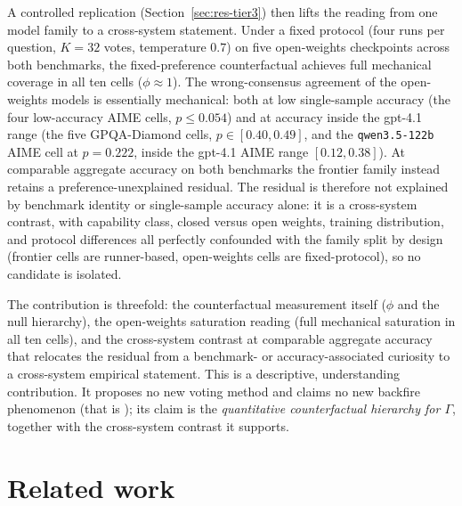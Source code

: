 \documentclass{article}
\newcommand{\agreementIndex}{\Gamma}
\begin{document}
A controlled replication (Section~\ref{sec:res-tier3}) then lifts the
reading from one model family to a cross-system statement. Under a fixed
protocol (four runs per question, $K=32$ votes, temperature $0.7$) on
five open-weights checkpoints across both benchmarks, the
fixed-preference counterfactual achieves full mechanical
coverage in all ten cells ($\phi\approx1$). The
wrong-consensus agreement of the open-weights models is essentially
mechanical: both at low single-sample accuracy (the four low-accuracy AIME cells,
$p\le0.054$) and at accuracy inside the gpt-4.1 range (the five GPQA-Diamond
cells, $p\in[0.40,0.49]$, and the \texttt{qwen3.5-122b} AIME cell at
$p=0.222$, inside the gpt-4.1 AIME range $[0.12,0.38]$). At comparable
aggregate accuracy on both benchmarks the frontier family instead retains a
preference-unexplained residual. The residual is therefore not
explained by benchmark identity or single-sample accuracy alone: it is a cross-system
contrast, with capability class, closed versus open weights, training
distribution, and protocol differences all perfectly confounded with the
family split by design (frontier cells are runner-based, open-weights
cells are fixed-protocol), so no candidate is isolated.

The contribution is threefold: the counterfactual measurement itself
($\phi$ and the null hierarchy), the open-weights saturation reading
(full mechanical saturation in all ten cells), and the
cross-system contrast at comparable aggregate accuracy that relocates the residual
from a benchmark- or accuracy-associated curiosity to a cross-system
empirical statement. This is a descriptive, understanding
contribution. It proposes no
new voting method and claims no new backfire phenomenon (that is
\cite{bahuguna2026when}); its claim is the \emph{quantitative
counterfactual hierarchy for $\agreementIndex$}, together with the cross-system
contrast it supports.

\section{Related work}
\label{sec:related}
\end{document}
